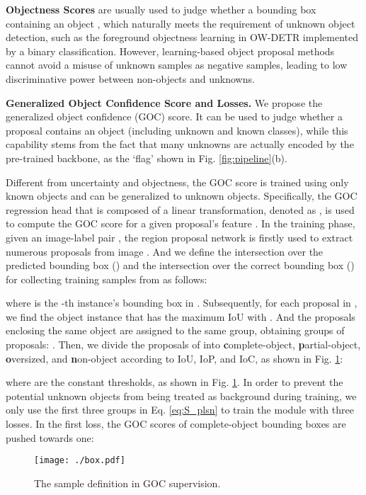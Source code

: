 \documentclass[10pt,twocolumn,letterpaper]{article}
\newcommand{\xf}[1]{{\color{black} #1}}
\newcommand{\ood}{unknown objects\xspace}
\begin{document}
\noindent\textbf{Objectness \xf{Scores}} \xf{are} usually used to judge whether a bounding box containing an object \cite{OLP,edgeboxes,ren2015faster},
which naturally meets the requirement of unknown object detection,
such as the foreground objectness learning in OW-DETR \cite{OWDETR} implemented by a binary classification.
However,
learning-based object proposal methods cannot avoid \xf{a} misuse of unknown samples as negative samples,
leading to low discriminative power between non-objects and unknowns.

\noindent\textbf{Generalized Object Confidence Score and Losses.}
We propose the generalized object confidence (GOC) score.
\xf{It can be used to judge} whether a proposal contains an object (including unknown and known classes),
while this capability stems from the fact that many unknowns are actually encoded by the pre-trained backbone,
as the `flag' shown in Fig. \ref{fig:pipeline}(b).

Different from uncertainty and objectness,
the GOC score is trained using only known objects and can be generalized to unknown objects.
Specifically,
the GOC regression head that is composed of a linear transformation, denoted as , is used to compute the GOC score  for a given proposal's feature .
In the training phase,
given an image-label pair ,
the region proposal network is firstly used to extract numerous proposals  from image .
And we define the intersection over the predicted bounding box () and \xf{the} intersection over the correct bounding box () for collecting training samples from  as follows:
\vspace{-6pt}

where  is the -th instance's bounding box in .
Subsequently, for each proposal  in ,
we find the object instance \xf{that has} the maximum IoU with .
And the proposals enclosing the same object are assigned to the same group,
obtaining  groups of proposals: .
Then,
we divide the proposals of  into \textbf{c}omplete-object, \textbf{p}artial-object, \textbf{o}versized, and \textbf{n}on-object according to IoU, IoP, and IoC,
as shown in Fig. \ref{fig:box}:

where  are the constant thresholds,
as shown in Fig. \ref{fig:box}.
In order to prevent the potential \ood from being \xf{treated} as background during training,
we only use the first three groups in Eq. \ref{eq:S_plsn} to train the module  \xf{with} three losses.
In the first loss,
the GOC scores of complete-object bounding boxes are pushed towards one:


\begin{figure}
\centering
\texttt{[image: ./box.pdf]}
\caption{The sample definition in GOC supervision.}
\vspace{-10pt}
\label{fig:box}
\end{figure}
\end{document}
